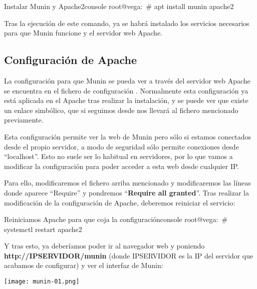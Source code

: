\begin{mycode}{Instalar Munin y Apache2}{console}{}
root@vega:~# apt install munin apache2
\end{mycode}

Tras la ejecución de este comando, ya se habrá instalado los servicios necesarios para que Munin funcione y el servidor web Apache.

\subsection{Configuración de Apache}
La configuración para que Munin se pueda ver a través del servidor web Apache se encuentra en el fichero de configuración   . Normalmente esta configuración ya está aplicada en el Apache tras realizar la instalación, y se puede ver que existe un enlace simbólico, que si seguimos desde    nos llevará al fichero mencionado previamente.

Esta configuración permite ver la web de Munin pero sólo si estamos conectados desde el propio servidor, a modo de seguridad sólo permite conexiones desde “localhost”. Esto no suele ser lo habitual en servidores, por lo que vamos a modificar la configuración para poder acceder a esta web desde cualquier IP.



Para ello, modificaremos el fichero arriba mencionado y modificaremos las líneas donde aparece “Require” y pondremos “\textbf{Require all granted}”. Tras realizar la modificación de la configuración de Apache, deberemos reiniciar el servicio:

\begin{mycode}{Reiniciamos Apache para que coja la configuración}{console}{}
root@vega:~# systemctl restart apache2
\end{mycode}

Y tras esto, ya deberíamos poder ir al navegador web y poniendo \textbf{http://IPSERVIDOR/munin} (donde IPSERVIDOR es la IP del servidor que acabamos de configurar) y ver el interfaz de Munin:

\begin{tcolorbox}[title=Interfaz de Munin]
    \centering
    \texttt{[image: munin-01.png]}
\end{tcolorbox}


